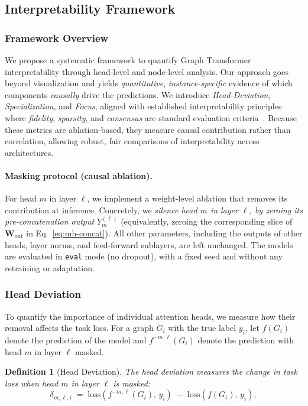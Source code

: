 \documentclass[lettersize,journal]{IEEEtran}
\newtheorem{definition}{Definition}
\begin{document}
\subsection{Interpretability Framework}
\label{method:interpret}

\subsubsection{Framework Overview}
We propose a systematic framework to quantify Graph Transformer interpretability through head-level and node-level analysis. Our approach goes beyond visualization and yields \emph{quantitative}, \emph{instance-specific} evidence of which components \emph{causally} drive the predictions. We introduce \textit{Head-Deviation}, \textit{Specialization}, and \textit{Focus}, aligned with established interpretability principles where \emph{fidelity}, \emph{sparsity}, and \emph{consensus} are standard evaluation criteria~\cite{amara_graphframex_2024,lukyanov_robustness_2025}. Because these metrics are ablation-based, they measure causal contribution rather than correlation, allowing robust, fair comparisons of interpretability across architectures.

\paragraph{Masking protocol (causal ablation).}
For head $m$ in layer $\ell$, we implement a weight-level ablation that removes its contribution at inference. Concretely, we \emph{silence head $m$ in layer $\ell$, by zeroing its pre-concatenation output} $Y_m^{(\ell)}$ (equivalently, zeroing the corresponding slice of $\mathbf{W}_{\text{out}}$ in Eq.~\ref{eq:mh-concat}). All other parameters, including the outputs of other heads, layer norms, and feed-forward sublayers, are left unchanged. The models are evaluated in \texttt{eval} mode (no dropout), with a fixed seed and without any retraining or adaptation.

\subsubsection{Head Deviation}
To quantify the importance of individual attention heads, we measure how their removal affects the task loss. For a graph $G_i$ with the true label $y_i$, let $f(G_i)$ denote the prediction of the model and $f^{-m,\ell}(G_i)$ denote the prediction with head $m$ in layer $\ell$ masked.

\begin{definition}[Head Deviation]
The head deviation measures the change in task loss when head $m$ in layer $\ell$ is masked:
\begin{equation}
\delta_{m,\ell,i} \;=\; \mathrm{loss}\!\left(f^{-m,\ell}(G_i),\, y_i\right) \;-\; \mathrm{loss}\!\left(f(G_i),\, y_i\right),
\end{equation}
\end{definition}
\end{document}
